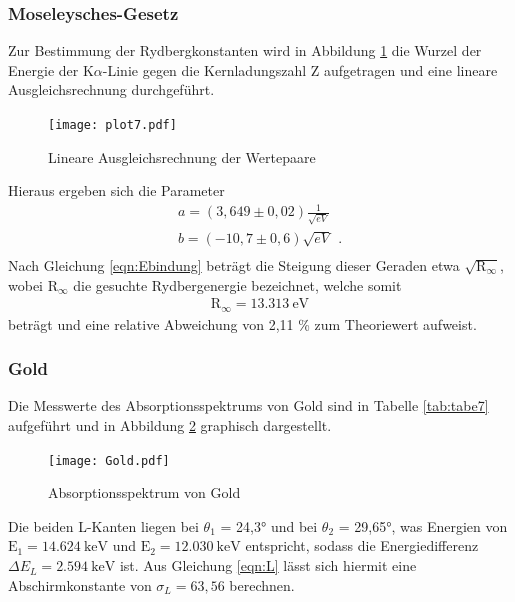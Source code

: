 \subsubsection{Moseleysches-Gesetz}
Zur Bestimmung der Rydbergkonstanten wird in Abbildung \ref{fig:plot7} die Wurzel der Energie
der K$\alpha$-Linie gegen die Kernladungszahl Z aufgetragen und eine lineare Ausgleichsrechnung
durchgeführt.
\begin{figure}[H]
  \centering
  \texttt{[image: plot7.pdf]}
  \caption{Lineare Ausgleichsrechnung der Wertepaare}
  \label{fig:plot7}
\end{figure}
Hieraus ergeben sich die Parameter
\begin{align*}
  a = (3,649 \pm 0,02) \frac{1}{\sqrt{eV}} \\
  b = (-10,7 \pm 0,6) \sqrt{eV} \: \: . \\
\end{align*}
Nach Gleichung \ref{eqn:Ebindung} beträgt die Steigung dieser
Geraden etwa $\sqrt{\text{R}_{\infty}}$,
wobei $\text{R}_{\infty}$ die gesuchte Rydbergenergie
bezeichnet, welche somit
\begin{align*}
  \text{R}_{\infty}= \SI{13.313}{\electronvolt}
\end{align*}
beträgt und eine relative Abweichung von 2,11 \% zum Theoriewert aufweist.
\subsubsection{Gold}
Die Messwerte des Absorptionsspektrums von Gold sind in Tabelle \ref{tab:tabe7} aufgeführt und
in Abbildung \ref{fig:Gold} graphisch dargestellt.

\begin{figure}[H]
  \centering
  \texttt{[image: Gold.pdf]}
  \caption{Absorptionsspektrum von Gold}
  \label{fig:Gold}
\end{figure}
Die beiden L-Kanten liegen bei $\theta_1$ = 24,3° und bei $\theta_2$ = 29,65°, was Energien
von $\text{E}_{1} = \SI{14.624}{\kilo\electronvolt}$ und
$\text{E}_{2} = \SI{12.030}{\kilo\electronvolt}$ entspricht, sodass die Energiedifferenz
$\Delta E_L = \SI{2.594}{\kilo\electronvolt}$ ist.
Aus Gleichung \ref{eqn:L} lässt sich hiermit eine Abschirmkonstante von
$\sigma_L = 63,56$ berechnen.
